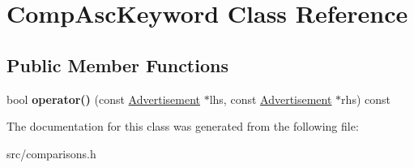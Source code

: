 \hypertarget{class_comp_asc_keyword}{}\section{Comp\+Asc\+Keyword Class Reference}
\label{class_comp_asc_keyword}
\subsection*{Public Member Functions}
\begin{DoxyCompactItemize}
\item 
\hypertarget{class_comp_asc_keyword_a1d065166f25bcf701a6ef25d3c5d728d}{}bool {\bfseries operator()} (const \hyperlink{class_advertisement}{Advertisement} $\ast$lhs, const \hyperlink{class_advertisement}{Advertisement} $\ast$rhs) const \label{class_comp_asc_keyword_a1d065166f25bcf701a6ef25d3c5d728d}

\end{DoxyCompactItemize}


The documentation for this class was generated from the following file\+:\begin{DoxyCompactItemize}
\item 
src/comparisons.\+h\end{DoxyCompactItemize}
